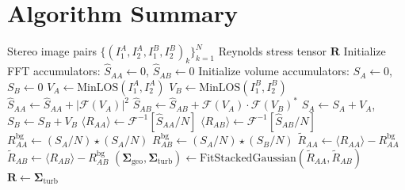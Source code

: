 \documentclass[11pt,a4paper]{article}
\begin{document}
\appendix

\section{Algorithm Summary}

\begin{algorithm}[H]
\caption{Stereo Ensemble PIV for Reynolds Stress Extraction}
\begin{algorithmic}[1]
\Require Stereo image pairs $\{(I_1^A, I_2^A, I_1^B, I_2^B)_k\}_{k=1}^N$
\Ensure Reynolds stress tensor $\mathbf{R}$
\State Initialize FFT accumulators: $\hat{S}_{AA} \gets 0$, $\hat{S}_{AB} \gets 0$
\State Initialize volume accumulators: $S_A \gets 0$, $S_B \gets 0$
    \State $V_A \gets \text{MinLOS}(I_1^A, I_2^A)$ 
    \State $V_B \gets \text{MinLOS}(I_1^B, I_2^B)$ 
    \State $\hat{S}_{AA} \gets \hat{S}_{AA} + |\mathcal{F}(V_A)|^2$
    \State $\hat{S}_{AB} \gets \hat{S}_{AB} + \mathcal{F}(V_A) \cdot \mathcal{F}(V_B)^*$
    \State $S_A \gets S_A + V_A$, $S_B \gets S_B + V_B$
\EndFor
\State $\langle R_{AA} \rangle \gets \mathcal{F}^{-1}[\hat{S}_{AA}/N]$ 
\State $\langle R_{AB} \rangle \gets \mathcal{F}^{-1}[\hat{S}_{AB}/N]$
\State $R_{AA}^{\text{bg}} \gets (S_A/N) \star (S_A/N)$ 
\State $R_{AB}^{\text{bg}} \gets (S_A/N) \star (S_B/N)$
\State $\tilde{R}_{AA} \gets \langle R_{AA} \rangle - R_{AA}^{\text{bg}}$ 
\State $\tilde{R}_{AB} \gets \langle R_{AB} \rangle - R_{AB}^{\text{bg}}$
\State $(\bm{\Sigma}_{\text{geo}}, \bm{\Sigma}_{\text{turb}}) \gets \text{FitStackedGaussian}(\tilde{R}_{AA}, \tilde{R}_{AB})$
\State \Return $\mathbf{R} \gets \bm{\Sigma}_{\text{turb}}$
\end{algorithmic}
\end{algorithm}
\end{document}
